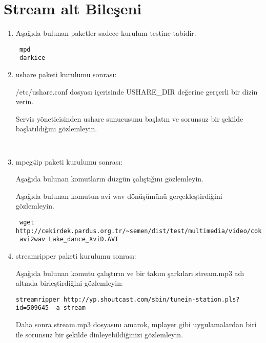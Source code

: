 \documentclass[a4paper,10pt]{article}
\begin{document}
\section{Stream alt Bileşeni}
\begin{enumerate}

\item Aşağıda bulunan paketler sadece kurulum testine tabidir.
\begin{verbatim}
 mpd
 darkice
\end{verbatim}

\item ushare paketi kurulumu sonrası:

/etc/ushare.conf dosyası içerisinde USHARE\_DIR değerine gerçerli bir dizin verin.

Servis yöneticisinden ushare sunucusunu başlatın ve sorunsuz bir şekilde başlatıldığını gözlemleyin.

\begin{verbatim}
 
\end{verbatim}

\item mpeg4ip paketi kurulumu sonrası:

Aşağıda bulunan komutların düzgün çalıştığını gözlemleyin.

Aşağıda bulunan komutun avi wav dönüşümünü gerçekleştirdiğini gözlemleyin.
\begin{verbatim}
 wget http://cekirdek.pardus.org.tr/~semen/dist/test/multimedia/video/cokluortam/Lake_dance_XviD.AVI
 avi2wav Lake_dance_XviD.AVI
\end{verbatim}

\item streamripper paketi kurulumu sonrası:

Aşağıda bulunan komutu çalıştırın ve bir takım şarkıları stream.mp3 adı altında birleştirdiğini gözlemleyin:
\begin{verbatim}
streamripper http://yp.shoutcast.com/sbin/tunein-station.pls?id=509645 -a stream 
\end{verbatim}

Daha sonra stream.mp3 dosyasını amarok, mplayer gibi uygulamalardan biri ile sorunsuz bir şekilde dinleyebildiğinizi gözlemleyin.

\end{enumerate}
\end{document}
